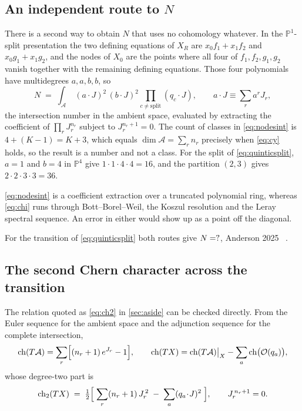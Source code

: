 \documentclass[11pt,a4paper]{article}
\newcommand{\PP}{\mathbb{P}}
\newcommand{\cO}{\mathcal{O}}
\newcommand{\ch}{\operatorname{ch}}
\newcommand{\XR}{X_R}
\theoremstyle{definition}
\begin{document}
\subsection{An independent route to \texorpdfstring{$N$}{N}}
\label{sec:nodesexpected}

There is a second way to obtain $N$ that uses no cohomology whatever. In the
$\PP^1$-split presentation the two defining equations of $\XR$ are
$x_0 f_1 + x_1 f_2$ and $x_0 g_1 + x_1 g_2$, and the nodes of $X_0$ are the
points where all four of $f_1,f_2,g_1,g_2$ vanish together with the remaining
defining equations. Those four polynomials have multidegrees $a,a,b,b$, so
%
\begin{equation}
N \;=\;
\int_{\mathcal{A}}
\;(a\!\cdot\!J)^2 \,(b\!\cdot\!J)^2
\prod_{c \neq \text{split}} (q_c\!\cdot\!J),
\qquad a\!\cdot\!J \equiv \sum_r a^r J_r ,
\label{eq:nodesint}
\end{equation}
%
the intersection number in the ambient space, evaluated by extracting the
coefficient of $\prod_r J_r^{n_r}$ subject to $J_r^{n_r+1}=0$. The count of
classes in \cref{eq:nodesint} is $4 + (K-1) = K+3$, which equals
$\dim\mathcal{A}=\sum_r n_r$ precisely when \cref{eq:cy} holds, so the result
is a number and not a class. For the split of \cref{eq:quinticsplit},
$a=1$ and $b=4$ in $\PP^4$ give $1\cdot1\cdot4\cdot4=16$, and the partition
$(2,3)$ gives $2\cdot2\cdot3\cdot3=36$.

\cref{eq:nodesint} is a coefficient
extraction over a truncated polynomial ring, whereas \cref{eq:chi} runs
through Bott--Borel--Weil, the Koszul resolution and the Leray spectral
sequence. An error in either would show up as a point off the diagonal.

For the transition of \cref{eq:quinticsplit} both routes give $N=?$, Anderson 2025 ~\cite{Anderson2025}.

\subsection{The second Chern character across the transition}
\label{sec:chtwo}

The relation quoted as \cref{eq:ch2} in \cref{sec:aside} can be checked
directly. From the Euler sequence for the ambient space and the adjunction
sequence for the complete intersection,
%
\begin{equation}
\ch(T\mathcal{A}) = \sum_r \Bigl[(n_r+1)\,e^{J_r} - 1\Bigr],
\qquad
\ch(TX) = \ch(T\mathcal{A})\big|_X - \sum_a \ch\bigl(\cO(q_a)\bigr),
\label{eq:chadj}
\end{equation}
%
whose degree-two part is
%
\begin{equation}
\ch_2(TX) \;=\; \tfrac{1}{2}\Bigl[\;
\sum_r (n_r+1)\,J_r^{\,2}
\;-\;\sum_a (q_a\!\cdot\!J)^2 \;\Bigr],
\qquad J_r^{\,n_r+1} = 0 .
\label{eq:chtwo}
\end{equation}
\end{document}
